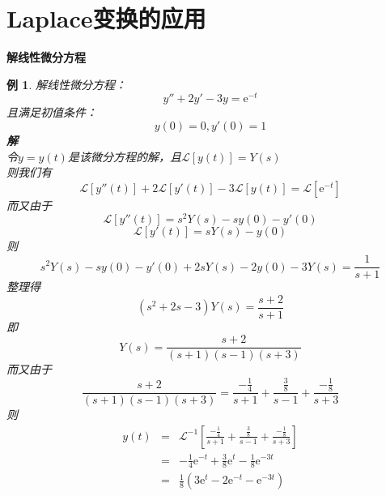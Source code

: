 \documentclass[12pt, a4paper, twoside]{ctexbook}
\newtheorem{example}[theorem]{例}
\begin{document}
\section{Laplace变换的应用}
\textbf{解线性微分方程}
\begin{example}
    解线性微分方程：
    $$
    y''+2y'-3y=\mathrm{e}^{-t}
    $$
    \hspace*{2em}且满足初值条件：
    $$
    y\left(0\right)=0,y'\left(0\right)=1
    $$
    \hspace*{1em}\textbf{解}\\
    \hspace*{2em}令$y=y\left(t\right)$是该微分方程的解，且$\mathscr{L}\left[ y\left(t\right)\right]=Y\left(s\right)$\\
    \hspace*{2em}则我们有
    $$
    \mathscr{L}\left[y''\left(t\right)\right]+2\mathscr{L}\left[y'\left(t\right)\right]-3\mathscr{L}\left[y\left(t\right)\right]=\mathscr{L}\left[\mathrm{e}^{-t}\right]
    $$
    \hspace*{2em}而又由于
    $$
    \mathscr{L}\left[y''\left(t\right)\right]=s^2Y\left(s\right)-sy\left(0\right)-y'\left(0\right)
    $$
    $$
    \mathscr{L}\left[y'\left(t\right)\right]=sY\left(s\right)-y\left(0\right)
    $$
    \hspace*{2em}则
    $$
    s^2 Y\left(s\right)-sy\left(0\right)-y'\left(0\right)+2sY\left(s\right)-2y\left(0\right)-3Y\left(s\right)=\frac{1}{s+1}
    $$
    \hspace*{2em}整理得
    $$
    \left(s^2+2s-3\right)Y\left(s\right)=\frac{s+2}{s+1}
    $$
    \hspace*{2em}即
    $$
    Y\left(s\right)=\frac{s+2}{\left(s+1\right)\left(s-1\right)\left(s+3\right)}
    $$
    \hspace*{2em}而又由于
    $$
    \frac{s+2}{\left(s+1\right)\left(s-1\right)\left(s+3\right)}=\frac{-\frac{1}{4}}{s+1}+\frac{\frac{3}{8}}{s-1}+\frac{-\frac{1}{8}}{s+3}
    $$
    \hspace*{2em}则
    \begin{eqnarray}
        y\left(t\right)&=&\mathscr{L}^{-1}\left[\frac{-\frac{1}{4}}{s+1}+\frac{\frac{3}{8}}{s-1}+\frac{-\frac{1}{8}}{s+3}\right] \nonumber      \\
        ~&=&-\frac{1}{4}\mathrm{e}^{-t}+\frac{3}{8}\mathrm{e}^{t}-\frac{1}{8}\mathrm{e}^{-3t} \nonumber    \\
        ~&=&\frac{1}{8}\left(3\mathrm{e}^t-2\mathrm{e}^{-t}-\mathrm{e}^{-3t}\right) \nonumber
    \end{eqnarray}
\end{example}
\end{document}
